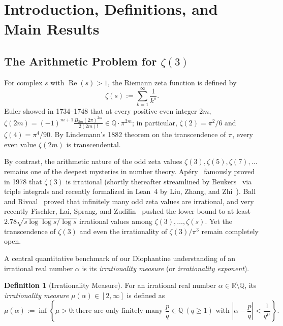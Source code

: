 \documentclass[11pt,reqno]{amsart}
\theoremstyle{definition}
\newtheorem{definition}[theorem]{Definition}
\theoremstyle{remark}
\newcommand{\QQ}{\mathbb{Q}}
\newcommand{\RR}{\mathbb{R}}
\begin{document}
\maketitle

\clearpage
\tableofcontents
\clearpage

\section{Introduction, Definitions, and Main Results}
\label{sec:intro}

\subsection{The Arithmetic Problem for \texorpdfstring{$\zeta(3)$}{zeta(3)}}
For complex $s$ with $\operatorname{Re}(s) > 1$, the Riemann zeta function is defined by
\[
  \zeta(s) := \sum_{k=1}^{\infty} \frac{1}{k^s}.
\]
Euler showed in 1734--1748 that at every positive even integer $2m$, $\zeta(2m) = (-1)^{m+1} \frac{B_{2m}(2\pi)^{2m}}{2(2m)!} \in \QQ\cdot \pi^{2m}$; in particular, $\zeta(2) = \pi^2/6$ and $\zeta(4) = \pi^4/90$. By Lindemann's 1882 theorem on the transcendence of $\pi$, every even value $\zeta(2m)$ is transcendental.

By contrast, the arithmetic nature of the odd zeta values $\zeta(3), \zeta(5), \zeta(7), \ldots$ remains one of the deepest mysteries in number theory. Ap{\'e}ry~\cite{Apery1979} famously proved in 1978 that $\zeta(3)$ is irrational (shortly thereafter streamlined by Beukers~\cite{Beukers1979} via triple integrals and recently formalized in Lean~4 by Liu, Zhang, and Zhi~\cite{LiuZhangZhi2025}). Ball and Rivoal~\cite{BallRivoal2001} proved that infinitely many odd zeta values are irrational, and very recently Fischler, Lai, Sprang, and Zudilin~\cite{FischlerLaiSprangZudilin2026} pushed the lower bound to at least $2.78\sqrt{s\log\log s / \log s}$ irrational values among $\zeta(3), \ldots, \zeta(s)$. Yet the transcendence of $\zeta(3)$ and even the irrationality of $\zeta(3)/\pi^3$ remain completely open.

A central quantitative benchmark of our Diophantine understanding of an irrational real number $\alpha$ is its \emph{irrationality measure} (or \emph{irrationality exponent}).

\begin{definition}[Irrationality Measure]
\label{def:mu}
For an irrational real number $\alpha \in \RR \setminus \QQ$, its \emph{irrationality measure} $\mu(\alpha) \in [2, \infty]$ is defined as
\[
  \mu(\alpha) := \inf \left\{ \mu > 0 : \text{there are only finitely many } \frac{p}{q} \in \QQ \ (q \ge 1) \text{ with } \left|\alpha - \frac{p}{q}\right| < \frac{1}{q^\mu} \right\}.
\]
\end{definition}
\end{document}

